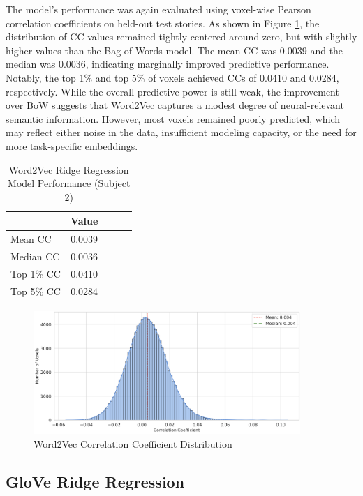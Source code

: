 \documentclass[11pt,letterpaper]{article}
\begin{document}
The model's performance was again evaluated using voxel-wise Pearson correlation coefficients on held-out test stories. As shown in Figure \ref{fig:prob_hist_w2v}, the distribution of CC values remained tightly centered around zero, but with slightly higher values than the Bag-of-Words model. The mean CC was 0.0039 and the median was 0.0036, indicating marginally improved predictive performance. Notably, the top 1\% and top 5\% of voxels achieved CCs of 0.0410 and 0.0284, respectively. While the overall predictive power is still weak, the improvement over BoW suggests that Word2Vec captures a modest degree of neural-relevant semantic information. However, most voxels remained poorly predicted, which may reflect either noise in the data, insufficient modeling capacity, or the need for more task-specific embeddings.

\begin{table}[H]
\centering
\begin{tabular}{lcccc}
\toprule
\textbf{} & \textbf{Value} \\
\midrule
Mean CC    & 0.0039 \\
Median CC  & 0.0036 \\
Top 1\% CC & 0.0410 \\
Top 5\% CC & 0.0284 \\
\bottomrule
\end{tabular}
\caption{Word2Vec Ridge Regression Model Performance (Subject 2)}
\label{tab:w2v_cc_results}
\end{table}

\begin{figure}[h]
    \centering
    \includegraphics[width=0.9\textwidth]{figs/cc-dist-word2vec.png}
    \caption{Word2Vec Correlation Coefficient Distribution}
    \label{fig:prob_hist_w2v}
\end{figure}

\vspace{1em} %
\subsection{GloVe Ridge Regression}
\vspace{0.5em} %
\end{document}
